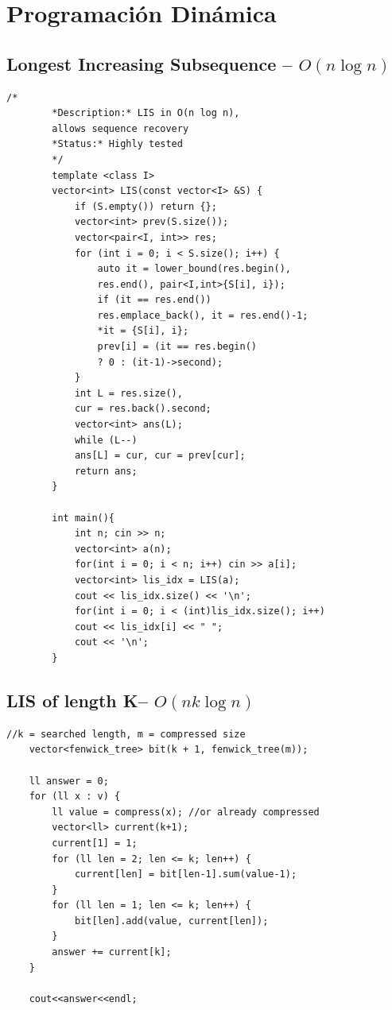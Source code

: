 \documentclass[10pt,a4paper,twocolumn]{article}
\begin{document}
	\section{Programaci\'on Din\'amica}
	
	\subsection{Longest Increasing Subsequence -- $O(n \log n)$}
	
	\begin{lstlisting}[style=cpp, title={LIS.cpp}]
		/*
		*Description:* LIS in O(n log n),
		allows sequence recovery
		*Status:* Highly tested
		*/
		template <class I>
		vector<int> LIS(const vector<I> &S) {
			if (S.empty()) return {};
			vector<int> prev(S.size());
			vector<pair<I, int>> res;
			for (int i = 0; i < S.size(); i++) {
				auto it = lower_bound(res.begin(),
				res.end(), pair<I,int>{S[i], i});
				if (it == res.end())
				res.emplace_back(), it = res.end()-1;
				*it = {S[i], i};
				prev[i] = (it == res.begin()
				? 0 : (it-1)->second);
			}
			int L = res.size(),
			cur = res.back().second;
			vector<int> ans(L);
			while (L--)
			ans[L] = cur, cur = prev[cur];
			return ans;
		}
		
		int main(){
			int n; cin >> n;
			vector<int> a(n);
			for(int i = 0; i < n; i++) cin >> a[i];
			vector<int> lis_idx = LIS(a);
			cout << lis_idx.size() << '\n';
			for(int i = 0; i < (int)lis_idx.size(); i++)
			cout << lis_idx[i] << " ";
			cout << '\n';
		}
	\end{lstlisting}
	
	\subsection{LIS of length K-- $O(nk \log n)$}
	\begin{lstlisting}[style=cpp, title={LIS$\_$lenght$\_$k.cpp}]
    //k = searched length, m = compressed size
    vector<fenwick_tree> bit(k + 1, fenwick_tree(m));

    ll answer = 0;
    for (ll x : v) {
        ll value = compress(x); //or already compressed
        vector<ll> current(k+1);
        current[1] = 1;
        for (ll len = 2; len <= k; len++) {
            current[len] = bit[len-1].sum(value-1);
        }
        for (ll len = 1; len <= k; len++) {
            bit[len].add(value, current[len]);
        }
        answer += current[k];
    }

    cout<<answer<<endl;
	\end{lstlisting}
	
\end{document}

